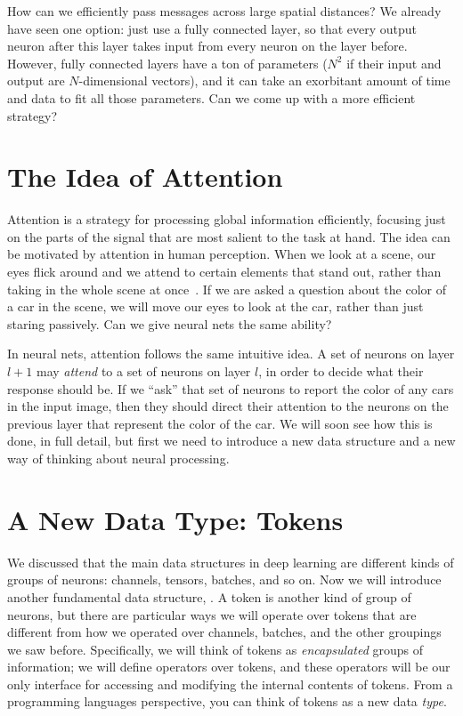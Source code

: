 How can we efficiently pass messages across large spatial distances? We already have seen one option: just use a fully connected layer, so that every output neuron after this layer takes input from every neuron on the layer before. However, fully connected layers have a ton of parameters ($N^2$ if their input and output are $N$-dimensional vectors), and it can take an exorbitant amount of time and data to fit all those parameters. Can we come up with a more efficient strategy?


\section{The Idea of Attention}
Attention is a strategy for processing global information efficiently, focusing just on the parts of the signal that are most salient to the task at hand. The idea can be motivated by attention in human perception. When we look at a scene, our eyes flick around and we attend to certain elements that stand out, rather than taking in the whole scene at once~\cite{wolfe2000visual}. If we are asked a question about the color of a car in the scene, we will move our eyes to look at the car, rather than just staring passively. Can we give neural nets the same ability?

In neural nets, attention follows the same intuitive idea. A set of neurons on layer $l+1$ may \textit{attend} to a set of neurons on layer $l$, in order to decide what their response should be. If we ``ask'' that set of neurons to report the color of any cars in the input image, then they should direct their attention to the neurons on the previous layer that represent the color of the car. We will soon see how this is done, in full detail, but first we need to introduce a new data structure and a new way of thinking about neural processing.

\section{A New Data Type: Tokens}
We discussed that the main data structures in deep learning are different kinds of groups of neurons: channels, tensors, batches, and so on. Now we will introduce another fundamental data structure, . A token is another kind of group of neurons, but there are particular ways we will operate over tokens that are different from how we operated over channels, batches, and the other groupings we saw before. Specifically,  we will think of tokens as \textit{encapsulated} groups of information; we will define operators over tokens, and these operators will be our only interface for accessing and modifying the internal contents of tokens. From a programming languages perspective, you can think of tokens as a new data \textit{type}.

